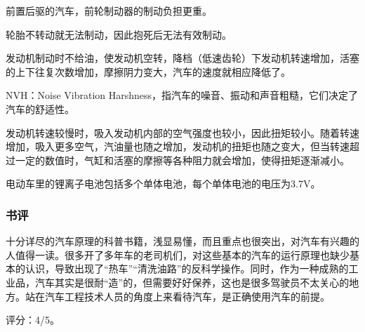 前置后驱的汽车，前轮制动器的制动负担更重。

轮胎不转动就无法制动，因此抱死后无法有效制动。

发动机制动时不给油，使发动机空转，降档（低速齿轮）下发动机转速增加，活塞的上下往复次数增加，摩擦阴力变大，汽车的速度就相应降低了。

NVH：Noise Vibration Harshness，指汽车的噪音、振动和声音粗糙，它们决定了汽车的舒适性。

发动机转速较慢时，吸入发动机内部的空气强度也较小，因此扭矩较小。随着转速增加，吸入更多空气，汽油量也随之增加，发动机的扭矩也随之变大，但当转速超过一定的数值时，气缸和活塞的摩擦等各种阻力就会增加，使得扭矩逐渐减小。

电动车里的锂离子电池包括多个单体电池，每个单体电池的电压为3.7V。

\subsubsection{书评}
十分详尽的汽车原理的科普书籍，浅显易懂，而且重点也很突出，对汽车有兴趣的人值得一读。很多开了多年车的老司机们，对这些基本的汽车的运行原理也缺少基本的认识，导致出现了“热车”“清洗油路”的反科学操作。同时，作为一种成熟的工业品，汽车其实是很耐“造”的，但需要好好保养，这也是很多驾驶员不太关心的地方。站在汽车工程技术人员的角度上来看待汽车，是正确使用汽车的前提。

评分：4/5。